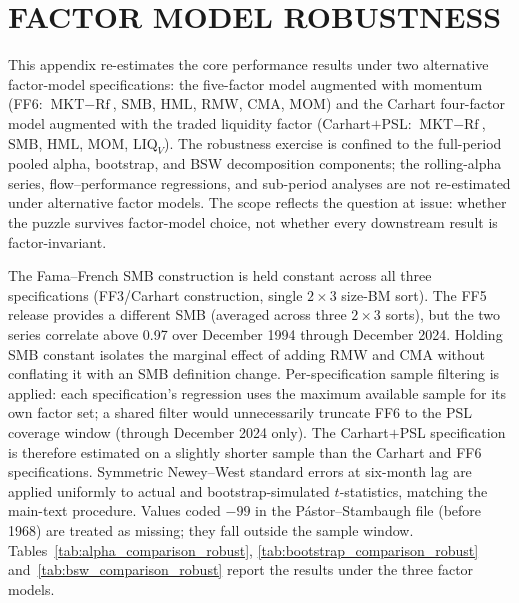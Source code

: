 \documentclass[12pt, oneside]{report}
\begin{document}


\chapter{FACTOR MODEL ROBUSTNESS}
\label{app:robustness}

\noindent This appendix re-estimates the core performance results
under two alternative factor-model specifications: the
\textcite{FamaFrench2015} five-factor model augmented with momentum
(FF6: $\text{MKT} - \text{Rf}$, $\text{SMB}$, $\text{HML}$,
$\text{RMW}$, $\text{CMA}$, $\text{MOM}$) and the Carhart
four-factor model augmented with the
\textcite{PastorStambaugh2003} traded liquidity factor (Carhart$+$PSL:
$\text{MKT} - \text{Rf}$, $\text{SMB}$, $\text{HML}$,
$\text{MOM}$, $\text{LIQ}_V$). The robustness exercise is
confined to the full-period pooled alpha, bootstrap, and BSW
decomposition components; the rolling-alpha series, flow--performance
regressions, and sub-period analyses are not re-estimated under
alternative factor models. The scope reflects the question at issue: whether the puzzle survives factor-model
choice, not whether every downstream result is factor-invariant.

The Fama--French SMB construction is held constant across all three
specifications (FF3/Carhart construction, single $2 \times 3$ size-BM
sort). The FF5 release provides a different SMB (averaged across
three $2 \times 3$ sorts), but the two series correlate above 0.97
over December 1994 through December 2024. Holding SMB constant
isolates the marginal effect of adding RMW and CMA without conflating
it with an SMB definition change. Per-specification sample filtering
is applied: each specification's regression uses the maximum
available sample for its own factor set; a shared filter would
unnecessarily truncate FF6 to the PSL coverage window (through
December 2024 only). The Carhart$+$PSL specification is therefore
estimated on a slightly shorter sample than the Carhart and FF6
specifications. Symmetric Newey--West standard errors at six-month
lag are applied uniformly to actual and bootstrap-simulated
$t$-statistics, matching the main-text procedure. Values coded $-99$ in
the Pástor--Stambaugh file (before 1968) are treated as missing; they fall
outside the sample window. Tables~\ref{tab:alpha_comparison_robust},
\ref{tab:bootstrap_comparison_robust} and~\ref{tab:bsw_comparison_robust}
report the results under the three factor models.
\end{document}

